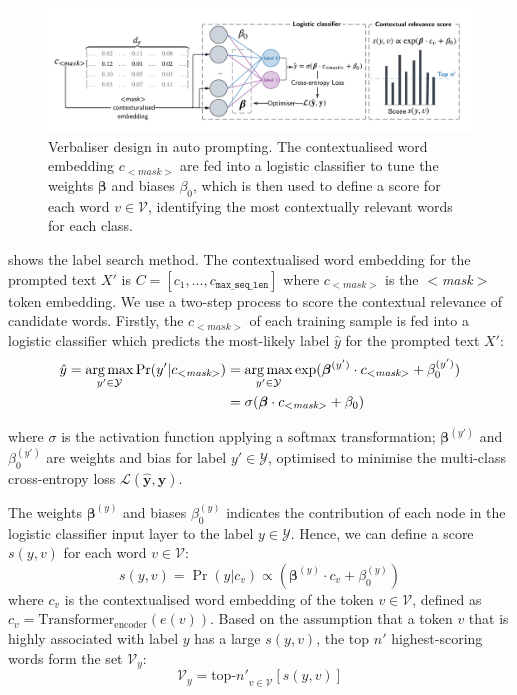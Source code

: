 \begin{figure}[!ht]
    \centering
    \includegraphics[width=\hsize]{figures/preparation_media/prepare-auto-verb.pdf}
    \caption{Verbaliser design in auto prompting. The contextualised word embedding $c_{<\textit{mask}>}$ are fed into a logistic classifier to tune the weights $\boldsymbol{\beta}$ and biases $\beta_0$, which is then used to define a score for each word $v \in \mathcal{V}$, identifying the most contextually relevant words for each class.}
    \label{fig:prepare-auto-verb}
\end{figure}

 shows the label search method.  The contextualised word embedding for the prompted text $X'$ is $C = [c_1, ..., c_{\texttt{max\_seq\_len}}]$ where $c_{<\textit{mask}>}$ is the $<$\textit{mask}$>$ token embedding. We use a two-step process to score the contextual relevance of candidate words. Firstly, the $c_{<\textit{mask}>}$ of each training sample is fed into a logistic classifier which predicts the most-likely label $\hat{y}$ for the prompted text $X'$:
\begin{equation}
\begin{split}
    \hat{y} = \operatorname*{arg\,max}_{y' \in \mathcal{Y}} \Pr(y'|c_{<\textit{mask}>}) 
     & = \operatorname*{arg\,max}_{y' \in \mathcal{Y}} \exp(\boldsymbol{\beta}^{(y')} \cdot  c_{<\textit{mask}>} + \beta_0^{(y')}) \\
    & = \sigma(\boldsymbol{\beta} \cdot c_{<\textit{mask}>} + \beta_0)
\end{split}
\end{equation}

where $\sigma$ is the activation function applying a softmax transformation; $\boldsymbol{\beta}^{(y')}$ and $\beta_0^{(y')}$ are weights and bias for label $y' \in  \mathcal{Y}$, optimised to minimise the multi-class cross-entropy loss $\mathcal{L}(\hat{\mathbf{y}}, \mathbf{y})$. 

The weights $\boldsymbol{\beta}^{(y)}$  and biases $\beta_0^{(y)}$ indicates the contribution of each node in the logistic classifier input layer to the label $y \in \mathcal{Y}$. Hence, we can define a score $s(y,v)$ for each word $v \in \mathcal{V}$: 
\begin{equation}
    s(y, v) = \Pr(y|c_v) \propto (\boldsymbol{\beta}^{(y)} \cdot c_v  + \beta_0^{(y)})
\end{equation}
where $c_v$ is the contextualised word embedding of the token $v \in \mathcal{V}$, defined as $c_v = \text{Transformer}_{\text{encoder}}(e(v))$. Based on the assumption that a token $v$ that is highly associated with label $y$ has a large $s(y,v)$, the top $n'$ highest-scoring words form the set $\mathcal{V}_y$:
\begin{equation}
    \mathcal{V}_y = {\text{top-}n'}_{v \in \mathcal{V}}[s(y,v)]
\end{equation}

